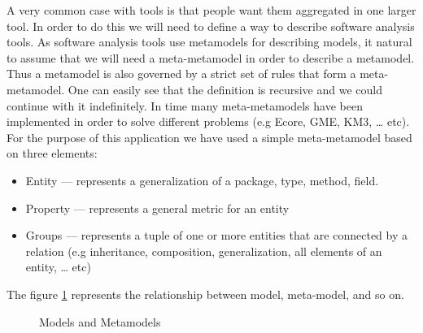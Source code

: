 	A very common case with tools is that people want them aggregated in one larger
tool. In order to do this we will need to define a way to describe software
analysis tools. As software analysis tools use metamodels for describing models,
it natural to assume that we will need a meta-metamodel in order to describe a
metamodel. Thus a metamodel is also governed by a strict set of rules that form
a meta-metamodel. One can easily see that the definition is recursive and we
could continue with it indefinitely. In time many meta-metamodels have been
implemented in order to solve different problems (e.g Ecore, GME, KM3, \ldots{}
etc). For the purpose of this application we have used a simple meta-metamodel
based on three elements: 
	\begin{itemize}
		\item Entity --- represents a generalization of a package, type, method, 
field.
 
		\item Property --- represents a general metric for an entity
		\item Groups --- represents a tuple of one or more entities that are connected
by a relation (e.g inheritance, composition, generalization, all elements of an
entity, \ldots{} etc)
	\end{itemize}
	
	The figure \ref{fig:metamodel} represents the relationship between model,
meta-model, and so on.
	 

\begin{figure}
\centering
{}
\caption{Models and Metamodels\label{fig:metamodel}}
\end{figure}

